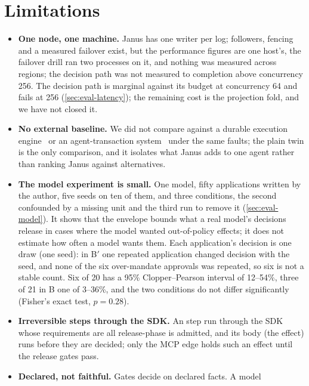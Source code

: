 \section{Limitations}
\label{sec:limits}

\begin{itemize}
\item \textbf{One node, one machine.} Janus has one writer per log; followers,
  fencing and a measured failover exist, but the performance figures are one
  host's, the failover drill ran two processes on it, and nothing was measured
  across regions; the decision path was not measured to completion above
  concurrency 256. The decision path is marginal against
  its budget at concurrency 64 and fails at 256 (\cref{sec:eval-latency}); the
  remaining cost is the projection fold, and we have not closed it.
\item \textbf{No external baseline.} We did not compare against a durable
  execution engine~\cite{temporal} or an agent-transaction
  system~\cite{sagallm,atomix,cordon} under the same faults; the plain twin is
  the only comparison, and it isolates what Janus adds to one agent rather than
  ranking Janus against alternatives.
\item \textbf{The model experiment is small.} One model, fifty applications
  written by the author, five seeds on ten of them, and three conditions, the
  second confounded by a missing unit and the third run to remove it
  (\cref{sec:eval-model}). It
  shows that the envelope bounds what a real model's decisions release in cases
  where the model wanted out-of-policy effects; it does not estimate how often a
  model wants them. Each application's decision is one draw (one seed): in B$'$
  one repeated application changed decision with the seed, and none of the six
  over-mandate approvals was repeated, so six is not a stable count. Six of 20
  has a 95\% Clopper--Pearson interval of 12--54\%, three of 21 in B one of
  3--36\%, and the two conditions do not differ significantly (Fisher's exact
  test, $p=0.28$).
\item \textbf{Irreversible steps through the SDK.} An 
  step run through the SDK whose requirements are all release-phase is admitted,
  and its body (the effect) runs before they are decided; only the MCP edge
  holds such an effect until the release gates pass.
\item \textbf{Declared, not faithful.} Gates decide on declared facts. A model

\end{itemize}
